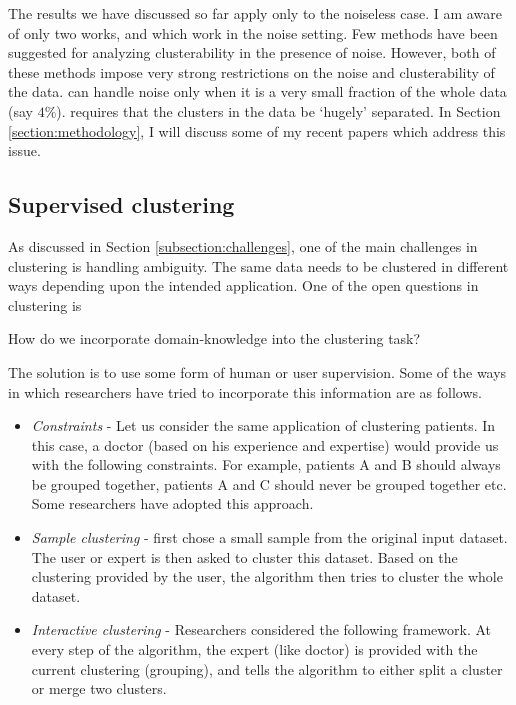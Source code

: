 \documentclass[11pt]{article}
\begin{document}
The results we have discussed so far apply only to the noiseless case. I am aware of only two works, \cite{balcan2012clustering} and \cite{ben2014clustering} which work in the noise setting. Few methods have been suggested for analyzing clusterability in the presence of noise. However, both of these methods impose very strong restrictions on the noise and clusterability of the data. \cite{balcan2012clustering} can handle noise only when it is a very small fraction of the whole data (say $4\%$). \cite{ben2014clustering} requires that the clusters in the data be `hugely' separated. In Section \ref{section:methodology}, I will discuss some of my recent papers which address this issue.

\subsection{Supervised clustering}
\label{subsection:supervisedclustering}
As discussed in Section \ref{subsection:challenges}, one of the main challenges in clustering is handling ambiguity. The same data needs to be clustered in different ways depending upon the intended application. One of the open questions in clustering is 
\begin{center}
How do we incorporate domain-knowledge into the clustering task?
\end{center}

The solution is to use some form of human or user supervision. Some of the ways in which researchers have tried to incorporate this information are as follows.
\begin{itemize}[nolistsep]
\item {\em Constraints} -  Let us consider the same application of clustering patients. In this case, a doctor (based on his experience and expertise) would provide us with the following constraints. For example, patients A and B should always be grouped together, patients A and C should never be grouped together etc. Some researchers \cite{basu2002semi,basu2004probabilistic} have adopted this approach.
\item {\em Sample clustering} - \cite{ashtiani2015representation} first chose a small sample from the original input dataset. The user or expert is then asked to cluster this dataset. Based on the clustering provided by the user, the algorithm then tries to cluster the whole dataset. 
\item {\em Interactive clustering} - Researchers \cite{balcan2008clustering} considered the following framework. At every step of the algorithm, the expert (like doctor) is provided with the current clustering (grouping), and tells the algorithm to either split a cluster or merge two clusters.
\end{itemize}
\end{document}
